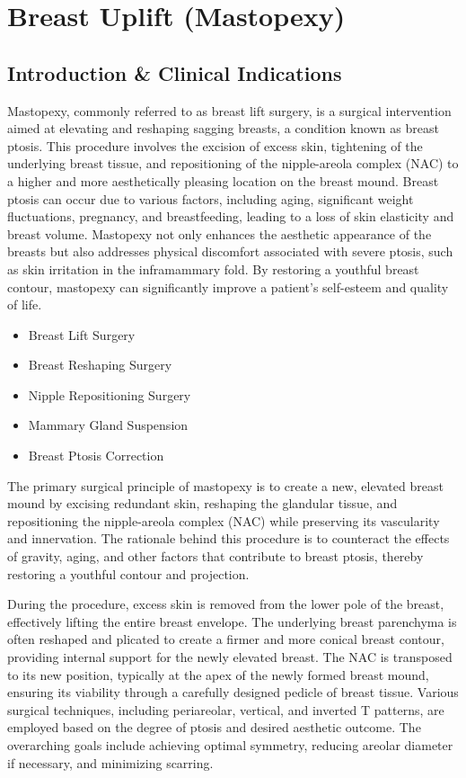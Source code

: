 \chapter{Breast Uplift (Mastopexy)}

\section*{Introduction \& Clinical Indications}
Mastopexy, commonly referred to as breast lift surgery, is a surgical intervention aimed at elevating and reshaping sagging breasts, a condition known as breast ptosis. This procedure involves the excision of excess skin, tightening of the underlying breast tissue, and repositioning of the nipple-areola complex (NAC) to a higher and more aesthetically pleasing location on the breast mound. Breast ptosis can occur due to various factors, including aging, significant weight fluctuations, pregnancy, and breastfeeding, leading to a loss of skin elasticity and breast volume. Mastopexy not only enhances the aesthetic appearance of the breasts but also addresses physical discomfort associated with severe ptosis, such as skin irritation in the inframammary fold. By restoring a youthful breast contour, mastopexy can significantly improve a patient's self-esteem and quality of life.

\begin{itemize}
  \item Breast Lift Surgery
  \item Breast Reshaping Surgery
  \item Nipple Repositioning Surgery
  \item Mammary Gland Suspension
  \item Breast Ptosis Correction
\end{itemize}

The primary surgical principle of mastopexy is to create a new, elevated breast mound by excising redundant skin, reshaping the glandular tissue, and repositioning the nipple-areola complex (NAC) while preserving its vascularity and innervation. The rationale behind this procedure is to counteract the effects of gravity, aging, and other factors that contribute to breast ptosis, thereby restoring a youthful contour and projection.

During the procedure, excess skin is removed from the lower pole of the breast, effectively lifting the entire breast envelope. The underlying breast parenchyma is often reshaped and plicated to create a firmer and more conical breast contour, providing internal support for the newly elevated breast. The NAC is transposed to its new position, typically at the apex of the newly formed breast mound, ensuring its viability through a carefully designed pedicle of breast tissue. Various surgical techniques, including periareolar, vertical, and inverted T patterns, are employed based on the degree of ptosis and desired aesthetic outcome. The overarching goals include achieving optimal symmetry, reducing areolar diameter if necessary, and minimizing scarring.

